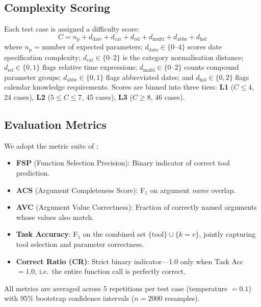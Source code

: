 \documentclass[11pt,twocolumn]{article}
\begin{document}
\subsection{Complexity Scoring}

Each test case is assigned a difficulty score:
\begin{equation}
C = n_p + d_{\text{date}} + d_{\text{cat}} + d_{\text{rel}} +
    d_{\text{multi}} + d_{\text{abbr}} + d_{\text{hol}}
\label{eq:complexity}
\end{equation}
where $n_p$ = number of expected parameters; $d_{\text{date}}
\in \{0\text{--}4\}$ scores date specification complexity;
$d_{\text{cat}} \in \{0\text{--}2\}$ is the category normalisation
distance; $d_{\text{rel}} \in \{0,1\}$ flags relative time
expressions; $d_{\text{multi}} \in \{0\text{--}2\}$ counts compound
parameter groups; $d_{\text{abbr}} \in \{0,1\}$ flags abbreviated
dates; and $d_{\text{hol}} \in \{0,2\}$ flags calendar knowledge
requirements.
Scores are binned into three tiers: \textbf{L1} ($C\leq4$, 24
cases), \textbf{L2} ($5\leq C\leq7$, 45 cases), \textbf{L3}
($C\geq8$, 46 cases).

\subsection{Evaluation Metrics}

We adopt the metric suite of \citet{kavathekar2025small}:

\begin{itemize}
    \item \textbf{FSP} (Function Selection Precision): Binary
          indicator of correct tool prediction.
    \item \textbf{ACS} (Argument Completeness Score): F$_1$ on
          argument \emph{name} overlap.
    \item \textbf{AVC} (Argument Value Correctness): Fraction of
          correctly named arguments whose values also match.
    \item \textbf{Task Accuracy}: F$_1$ on the combined set
          $\{\text{tool}\} \cup \{k{=}v\}$, jointly capturing tool
          selection and parameter correctness.
    \item \textbf{Correct Ratio (CR)}: Strict binary indicator---1.0
          only when Task Acc $= 1.0$, i.e.\ the entire function call
          is perfectly correct.
\end{itemize}

All metrics are averaged across 5 repetitions per test case
(temperature $= 0.1$) with 95\% bootstrap confidence intervals
\citep{efron1979bootstrap} ($n=2000$ resamples).
\end{document}
